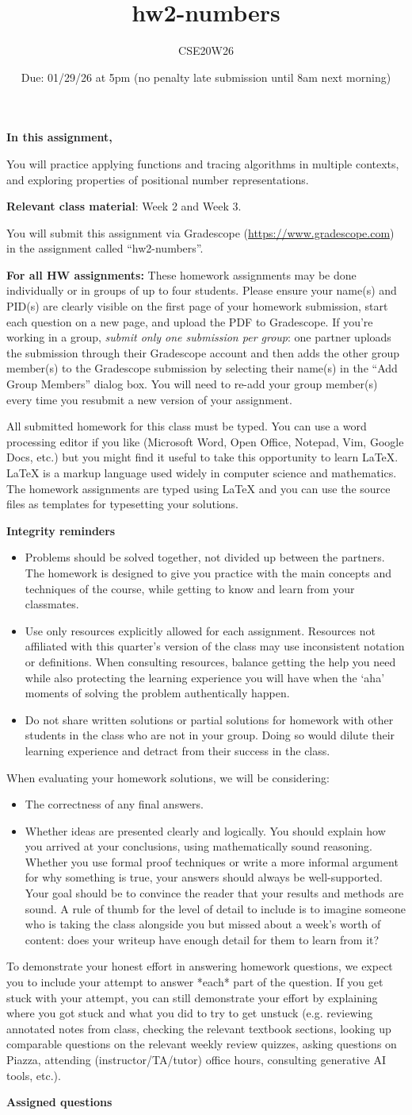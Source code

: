 \documentclass[12pt, oneside]{article}
\author{CSE20W26}
\title{hw2-numbers}
\date{Due: 01/29/26 at 5pm (no penalty late submission until 8am next morning)}
\newcommand{\instructions}{{\bf For all HW assignments:} 
These homework assignments may be done individually or in groups of up to four students.
Please ensure your name(s) and PID(s)
are clearly visible on the first page of your homework
submission, start each question on a new page, and upload the PDF to Gradescope.
If you're working in a group, {\it submit only one submission per group}: one partner uploads the
submission through their Gradescope account and then adds the other group member(s) to the Gradescope submission
by selecting their name(s) in the ``Add Group Members'' dialog box. You will need to re-add your group member(s)
every time you resubmit a new version of your assignment.

All submitted homework for this class must be typed. 
You can use a word processing editor if you like (Microsoft Word, Open Office, Notepad, Vim, Google Docs, etc.) 
but you might find it useful to take this opportunity to learn LaTeX. 
LaTeX is a markup language used widely in computer science and mathematics. 
The homework assignments are typed using LaTeX and you can use the source files 
as templates for typesetting your solutions.

{\bf Integrity reminders}
\begin{itemize}
\item Problems should be solved together, not divided up between the partners. The homework is
designed to give you practice with the main concepts and techniques of the course, 
while getting to know and learn from your classmates.
\item Use only resources explicitly allowed for each assignment. Resources not affiliated with this quarter's version of the class may use inconsistent notation or definitions. When consulting resources, balance
getting the help you need while also protecting the learning experience you will have when the `aha' moments of solving the problem authentically happen.
\item Do not share written solutions or partial solutions for homework with 
other students in the class who are not in your group. Doing so would dilute their learning 
experience and detract from their success in the class.
\end{itemize}

When evaluating your homework solutions, we will be considering:
\begin{itemize}
\item The correctness of any final answers.
\item Whether ideas are presented clearly and logically. You should explain how you arrived at your conclusions, using
mathematically sound reasoning. Whether you use formal proof techniques or 
write a more informal argument
for why something is true, your answers should always be well-supported. 
Your goal should be to convince the
reader that your results and methods are sound. A rule of thumb for the level of detail to include is to imagine someone who is taking the class alongside you but missed about a week's worth of content: does your writeup have enough detail for them to learn from it?
\end{itemize}
To demonstrate your honest effort in answering homework questions, we 
expect you to include your attempt to answer *each* part of the question. 
If you get stuck with your attempt, you can still demonstrate 
your effort by explaining where you got stuck and what 
you did to try to get unstuck (e.g. reviewing annotated notes from class, checking the relevant textbook sections, looking up comparable questions on the relevant weekly review quizzes, asking questions on Piazza, 
attending (instructor/TA/tutor) office hours, consulting generative AI tools, etc.). 
}
\begin{document}
\maketitle
\thispagestyle{fancy}


{\bf In this assignment,}

You will practice applying functions and tracing algorithms in multiple contexts, 
and exploring properties of positional number representations.

{\bf Relevant class material}: Week 2 and Week 3.

You will submit this assignment via Gradescope
(\href{https://www.gradescope.com}{https://www.gradescope.com}) 
in the assignment called ``hw2-numbers''.

\instructions

{\bf Assigned questions}
\end{document}
